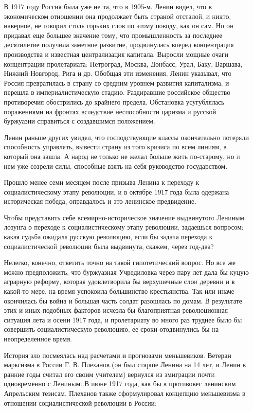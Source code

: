 \documentclass[12pt, a4paper, openany]{book}
\begin{document}
В 1917 году Россия была уже не та, что в 1905-м. Ленин видел, что в экономическом отношении она продолжает быть страной отсталой, и никто, наверное, не говорил столь горьких слов по этому поводу, как он сам. Но он придавал еще большее значение тому, что промышленность за последнее десятилетие получила заметное развитие, продвинулась вперед концентрация производства и известная централизация капитала. Выросли мощные очаги концентрации пролетариата: Петроград, Москва, Донбасс, Урал, Баку, Варшава, Нижний Новгород, Рига и др. Обобщая эти изменения, Ленин указывал, что Россия превратилась в страну со средним уровнем развития капитализма, и перешла в империалистическую стадию. Раздиравшие российское общество противоречия обострились до крайнего предела. Обстановка усугублялась поражениями на фронтах вследствие неспособности царизма и русской буржуазии справиться с создавшимся положением.

Ленин раньше других увидел, что господствующие классы окончательно потеряли способность управлять, вывести страну из того кризиса по всем линиям, в который она зашла. А народ не только не желал больше жить по-старому, но и нем уже созрели силы, способные взять на себя руководство государством.

Прошло менее семи месяцем после призыва Ленина к переходу к социалистическому этапу революции, и в октябре 1917 года была одержана историческая победа, оправдалось и это ленинское предвидение.

Чтобы представить себе всемирно-историческое значение выдвинутого Лениным лозунга о переходе к социалистическому этапу революции, задаешься вопросом: какая судьба ожидала русскую революцию, если бы задача перехода к социалистической революции была выдвинута, скажем, через год-два?

Нелегко, конечно, ответить точно на такой гипотетический вопрос. Но все же можно предположить, что буржуазная Учредиловка через пару лет дала бы куцую аграрную реформу, которая удовлетворила бы верхушечные слои деревни и в какой-то мере, на время успокоила большинство крестьянства. Так или иначе окончилась бы война и большая часть солдат разошлась по домам. В результате этих и иных подобных факторов исчезла бы благоприятная революционная ситуация лета и осени 1917 года, и пролетариату во много раз труднее было бы совершить социалистическую революцию, ее сроки отодвинулись бы на неопределенное время.

История зло посмеялась над расчетами и прогнозами меньшевиков. Ветеран марксизма в России Г. В. Плеханов (он был старше Ленина на 14 лет, и Ленин в ранние годы считал его своим учителем) вернулся из эмиграции почти одновременно с Лениным. В июне 1917 года, как бы в противовес ленинским Апрельским тезисам, Плеханов также сформулировал концепцию меньшевизма в отношении социалистической революции в России:
\end{document}
